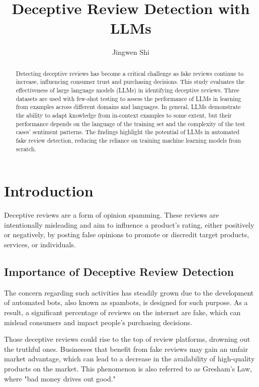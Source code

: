\documentclass[sigconf, nonacm]{acmart}
\theoremstyle{definition}
\begin{document}
\title{Deceptive Review Detection with LLMs}

\author{Jingwen Shi}

\renewcommand{\shortauthors}{Jingwen Shi}

\begin{abstract}
Detecting deceptive reviews has become a critical challenge as fake reviews continue to increase, influencing consumer trust and purchasing decisions. This study evaluates the effectiveness of large language models (LLMs) in identifying deceptive reviews. Three datasets are used with few-shot testing to assess the performance of LLMs in learning from examples across different domains and languages. In general, LLMs demonstrate the ability to adapt knowledge from in-context examples to some extent, but their performance depends on the language of the training set and the complexity of the test cases' sentiment patterns. The findings highlight the potential of LLMs in automated fake review detection, reducing the reliance on training machine learning models from scratch.
\end{abstract}

\maketitle

\section{Introduction}
Deceptive reviews are a form of opinion spamming. These reviews are intentionally misleading and aim to influence a product's rating, either positively or negatively, by posting false opinions to promote or discredit target products, services, or individuals.

\subsection{Importance of Deceptive Review Detection}
The concern regarding such activities has steadily grown due to the development of automated bots, also known as spambots, is designed for such purpose. As a result, a significant percentage of reviews on the internet are fake, which can mislead consumers and impact people's purchasing decisions.

Those deceptive reviews could rise to the top of review platforms, drowning out the truthful ones. Businesses that benefit from fake reviews may gain an unfair market advantage, which can lead to a decrease in the availability of high-quality products on the market. This phenomenon is also referred to as Gresham's Law, where "bad money drives out good."
\end{document}
